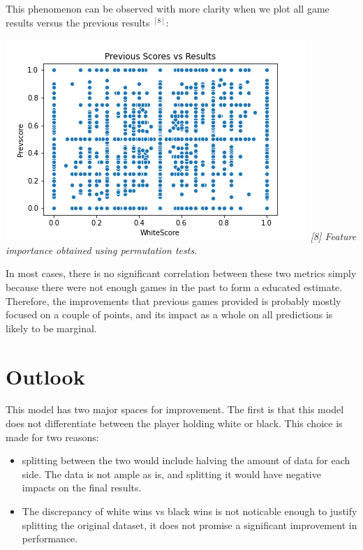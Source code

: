 \documentclass[12pt, letterpaper]{article}
\begin{document}
\begin{multicols}{2}
\begin{center}
\begin{scriptsize}
\end{scriptsize}
\end{center}
\setlength{\parskip}{0.1cm}

This phenomenon can be observed with more clarity when we plot all game results versus the previous results $^{[8]}$:

\setlength{\parskip}{0.0cm}
\begin{center}
\begin{scriptsize}

\includegraphics[width=\linewidth]{../figures/prev_and_cur_results.png}
\textit{[8] Feature importance obtained using permutation tests.}

\end{scriptsize}
\end{center}
\setlength{\parskip}{0.1cm}

In most cases, there is no significant correlation between these two metrics simply because there were not enough games in the past to form a educated estimate. Therefore, the improvements that previous games provided is probably mostly focused on a couple of points, and its impact as a whole on all predictions is likely to be marginal.

\section*{Outlook}

This model has two major spaces for improvement. The first is that this model does not differentiate between the player holding white or black. This choice is made for two reasons: 

\begin{itemize}
\item splitting between the two would include halving the amount of data for each side. The data is not ample as is, and splitting it would have negative impacts on the final results.
\item The discrepancy of white wins vs black wins is not noticable enough to justify splitting the original dataset, it does not promise a significant improvement in performance.
\end{itemize}


\end{multicols}
\end{document}
